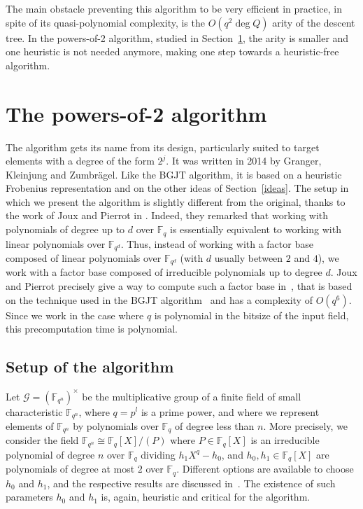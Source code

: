 \documentclass[a4paper,11pt]{article}
\theoremstyle{break}
\theoremstyle{sc}
\theoremstyle{definition}
\theoremstyle{remark}
\begin{document}
The main obstacle preventing this algorithm to be very efficient in practice, in
spite of its quasi-polynomial complexity, is the $O(q^2\deg Q)$ arity  of the
descent tree. In the powers-of-2 algorithm, studied in
Section~\ref{powers-of-2}, the arity is smaller and one heuristic is not needed
anymore, making one step towards a heuristic-free algorithm.

\section{The powers-of-2 algorithm}
\label{powers-of-2}

The algorithm gets its name from its design, particularly suited to target
elements with a degree of the form $2^j$. It was written in 2014 by Granger,
Kleinjung and Zumbrägel. Like the BGJT algorithm, it is based on a heuristic
Frobenius representation and on the other ideas of Section~\ref{ideas}.
The setup in which we present the algorithm is slightly different from
the original, thanks to the work of Joux and Pierrot in \cite{JP14}. Indeed,
they remarked that working with polynomials of degree up to $d$ over $\mathbb{F}_q$ is
essentially equivalent to working with linear polynomials over $\mathbb{F}_{q^d}$. Thus,
instead of working with a factor base composed of linear polynomials over
$\mathbb{F}_{q^d}$ (with $d$ usually between $2$ and $4$), we work with a
factor base composed of irreducible polynomials up to degree $d$. Joux and Pierrot
precisely give a way to compute such a factor base in~\cite{JP14}, that is based
on the technique used in the BGJT algorithm~\cite{Joux13, BGJT13} and has a
complexity of $O(q^6)$. Since we work in the case where $q$ is polynomial in the
bitsize of the input field, this precomputation time is polynomial.

\subsection{Setup of the algorithm}

Let $\mathcal G = (\mathbb{F}_{q^n})^\times$ be the multiplicative group of a finite
field of small characteristic $\mathbb{F}_{q^n}$, where $q=p^l$ is a prime
power, and where we represent elements of $\mathbb{F}_{q^n}$ by polynomials over
$\mathbb{F}_q$ of degree less than $n$. More
precisely, we consider the field $\mathbb{F}_{q^n}\cong \mathbb{F}_{q}[X]/(P)$
where $P\in \mathbb{F}_{q}[X]$ is an irreducible polynomial of degree $n$ over
$\mathbb{F}_{q}$ dividing $h_1X^q-h_0$, and $h_0, h_1\in \mathbb{F}_q[X]$ are
polynomials of degree at most $2$ over $\mathbb{F}_q$. Different options are
available to choose $h_0$ and $h_1$, and the respective results are 
discussed in~\cite{JP14}. The existence of such parameters $h_0$ and $h_1$ is,
again, heuristic and critical for the algorithm.
\end{document}
